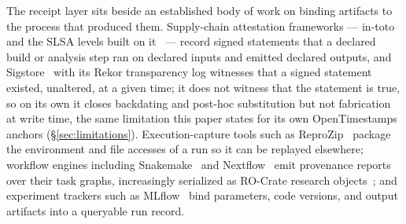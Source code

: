 \documentclass[11pt]{article}
\begin{document}
The receipt layer sits beside an established body of work on binding
artifacts to the process that produced them. Supply-chain attestation
frameworks --- in-toto~\cite{Torres2019} and the SLSA levels built on
it~\cite{SLSA} --- record signed statements that a declared build or analysis
step ran on declared inputs and emitted declared outputs, and
Sigstore~\cite{Sigstore} with its Rekor transparency log witnesses that a
signed statement existed, unaltered, at a given time; it does not witness
that the statement is true, so on its own it closes backdating and
post-hoc substitution but not fabrication at write time, the same
limitation this paper states for its own OpenTimestamps anchors
(\S\ref{sec:limitations}). Execution-capture tools such as
ReproZip~\cite{Chirigati2016} package the environment and file accesses of a
run so it can be replayed elsewhere; workflow engines including
Snakemake~\cite{Molder2021} and Nextflow~\cite{DiTommaso2017} emit provenance
reports over their task graphs, increasingly serialized as RO-Crate research
objects~\cite{Soiland2022}; and experiment trackers such as
MLflow~\cite{Zaharia2018} bind parameters, code versions, and output
artifacts into a queryable run record.
\end{document}
